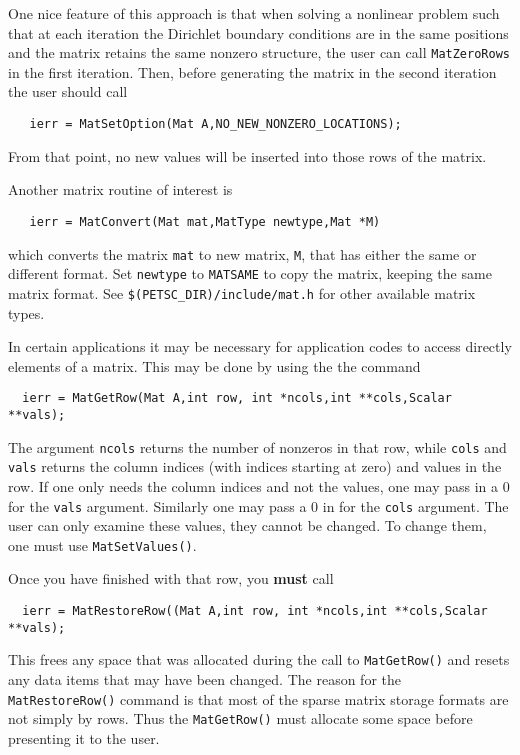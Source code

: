 One nice feature of this approach is that when solving a nonlinear problem 
such that at each iteration the Dirichlet boundary conditions are in the 
same positions and the matrix retains the same nonzero structure, the user 
can call {\tt MatZeroRows} in the first iteration. Then, before generating 
the matrix in the second iteration the user should call
\begin{verbatim}
   ierr = MatSetOption(Mat A,NO_NEW_NONZERO_LOCATIONS);
\end{verbatim}
From that point, 
no new values will be inserted into those rows of 
the matrix.  

Another matrix routine of interest is 
\begin{verbatim}
   ierr = MatConvert(Mat mat,MatType newtype,Mat *M)
\end{verbatim}
which converts the matrix {\tt mat} to new matrix, {\tt M}, that has
either the same or different format.  Set {\tt newtype} to {\tt MATSAME}
to copy the matrix, keeping the same matrix format.  See 
{\tt \$(PETSC\_DIR)/include/mat.h} for other available matrix types.

In certain applications it may be necessary for application codes
to access directly elements of a matrix. This may be done by using the 
the command 
\begin{verbatim}
  ierr = MatGetRow(Mat A,int row, int *ncols,int **cols,Scalar **vals);
\end{verbatim}
The argument {\tt ncols} returns the number of nonzeros in that row, 
while {\tt cols} and {\tt vals} returns the column indices (with indices
starting at zero) and values in the row. If one only needs the column 
indices and not the values, one may pass in a 0 for the {\tt vals}
argument. Similarly one may pass a 0 in for the {\tt cols} argument.
The user can only examine these values, they cannot be changed. 
To change  
them, one must use {\tt MatSetValues()}.

Once you have finished with that row, you {\bf must} call 
\begin{verbatim}
  ierr = MatRestoreRow((Mat A,int row, int *ncols,int **cols,Scalar **vals);
\end{verbatim}
This frees any space that was allocated during the call to 
{\tt MatGetRow()} and resets any data items that may have been 
changed. The reason for the {\tt MatRestoreRow()} command is that 
most of the sparse matrix storage formats are not simply by rows. 
Thus the {\tt MatGetRow()} must allocate some space before presenting 
it to the user.
 

